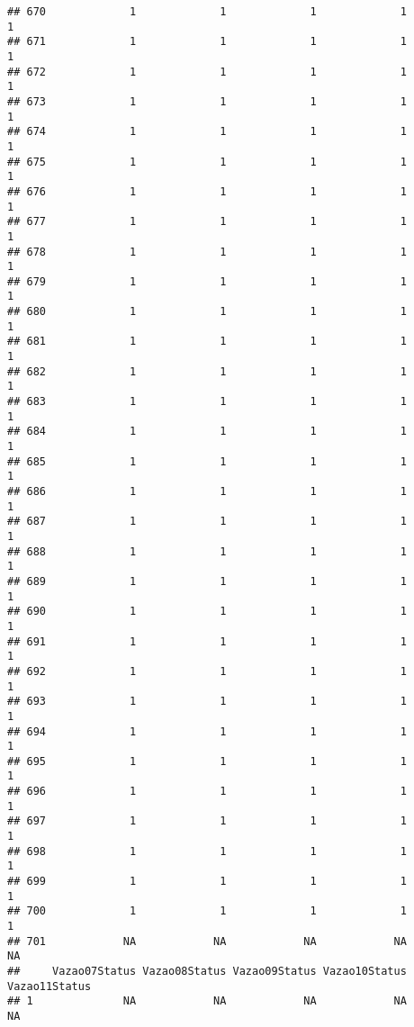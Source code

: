 \documentclass[
]{article}
\begin{document}
\begin{verbatim}
## 670             1             1             1             1             1
## 671             1             1             1             1             1
## 672             1             1             1             1             1
## 673             1             1             1             1             1
## 674             1             1             1             1             1
## 675             1             1             1             1             1
## 676             1             1             1             1             1
## 677             1             1             1             1             1
## 678             1             1             1             1             1
## 679             1             1             1             1             1
## 680             1             1             1             1             1
## 681             1             1             1             1             1
## 682             1             1             1             1             1
## 683             1             1             1             1             1
## 684             1             1             1             1             1
## 685             1             1             1             1             1
## 686             1             1             1             1             1
## 687             1             1             1             1             1
## 688             1             1             1             1             1
## 689             1             1             1             1             1
## 690             1             1             1             1             1
## 691             1             1             1             1             1
## 692             1             1             1             1             1
## 693             1             1             1             1             1
## 694             1             1             1             1             1
## 695             1             1             1             1             1
## 696             1             1             1             1             1
## 697             1             1             1             1             1
## 698             1             1             1             1             1
## 699             1             1             1             1             1
## 700             1             1             1             1             1
## 701            NA            NA            NA            NA            NA
##     Vazao07Status Vazao08Status Vazao09Status Vazao10Status Vazao11Status
## 1              NA            NA            NA            NA            NA

\end{verbatim}
\end{document}
